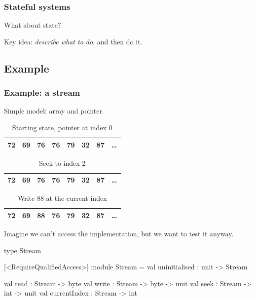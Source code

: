 \documentclass{beamer}
\begin{document}
\begin{frame}
\tableofcontents[currentsection]
\end{frame}

\begin{frame}
\frametitle{Stateful systems}
What about state?

Key idea: \emph{describe what to do}, and then do it.
\end{frame}

\subsection{Example}
\begin{frame}[fragile]
\frametitle{Example: a stream}
Simple model: array and pointer.

\begin{table}
\captionsetup{labelformat=empty}
\caption{Starting state, pointer at index $0$}
\begin{tabular}{ |c|c|c|c|c|c|c|c }
    \hline
    \color{red}72 & 69 & 76 & 76 & 79 & 32 & 87 & \dots \\
    \hline
\end{tabular}
\end{table}

\begin{table}
\captionsetup{labelformat=empty}
\caption{Seek to index $2$}
\begin{tabular}{ |c|c|c|c|c|c|c|c }
    \hline
    72 & 69 & \color{red}76 & 76 & 79 & 32 & 87 & \dots \\
    \hline
\end{tabular}
\end{table}

\begin{table}
\captionsetup{labelformat=empty}
\caption{Write $88$ at the current index}
\begin{tabular}{ |c|c|c|c|c|c|c|c }
    \hline
    72 & 69 & \color{red}88 & 76 & 79 & 32 & 87 & \dots \\
    \hline
\end{tabular}
\end{table}

\end{frame}

\begin{frame}[fragile]
Imagine we can't access the implementation, but we want to test it anyway.

\begin{fslisting}
type Stream

[<RequireQualifiedAccess>]
module Stream =
    val uninitialised : unit -> Stream

    val read : Stream -> byte
    val write : Stream -> byte -> unit
    val seek : Stream -> int -> unit
    val currentIndex : Stream -> int
\end{fslisting}
\end{frame}
\end{document}
